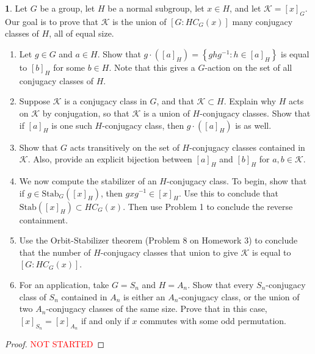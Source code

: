 \documentclass[12pt]{article}
\theoremstyle{definition}
\newtheorem{ex}{}
\begin{document}
\begin{ex}
	Let $G$ be a group, let $H$ be a normal subgroup, let $x \in H$, and let $\mathcal{K} = [x]_G$.
	Our goal is to prove that $\mathcal{K}$ is the union of $[G : HC_G(x)]$ many conjugacy classes of $H$, all of equal size.
	\begin{enumerate}[label=(\alph*)]
		\item Let $g \in G$ and $a \in H$.
		      Show that $g \cdot ([a]_H) = \left\lbrace ghg^{-1} : h \in [a]_H \right\rbrace$ is equal to $[b]_H$ for some $b \in H$.
		      Note that this gives a $G$-action on the set of all conjugacy classes of $H$.
		\item Suppose $\mathcal{K}$ is a conjugacy class in $G$, and that $\mathcal{K} \subset H$.
		      Explain why $H$ acts on $\mathcal{K}$ by conjugation, so that $\mathcal{K}$ is a union of $H$-conjugacy classes.
		      Show that if $[a]_H$ is one such $H$-conjugacy class, then $g \cdot ([a]_H)$ is as well.
		\item Show that $G$ acts transitively on the set of $H$-conjugacy classes contained in $\mathcal{K}$. Also, provide an explicit bijection between $[a]_H$ and $[b]_H$ for $a, b \in \mathcal{K}$.
		\item We now compute the stabilizer of an $H$-conjugacy class.
		      To begin, show that if $g \in \mathrm{Stab}_G([x]_H)$, then $gxg^{-1} \in [x]_H$.
		      Use this to conclude that $\mathrm{Stab}([x]_H) \subset HC_G(x)$.
		      Then use Problem 1 to conclude the reverse containment.
		\item Use the Orbit-Stabilizer theorem (Problem 8 on Homework 3) to conclude that the number of $H$-conjugacy classes that union to give $\mathcal{K}$ is equal to $[G : HC_G(x)]$.
		\item For an application, take $G = S_n$ and $H = A_n$.
		      Show that every $S_n$-conjugacy class of $S_n$ contained in $A_n$ is either an $A_n$-conjugacy class, or the union of two $A_n$-conjugacy classes of the same size.
		      Prove that in this case, $[x]_{S_n} = [x]_{A_n}$ if and only if $x$ commutes with some odd permutation.
	\end{enumerate}
\end{ex}
\begin{proof}
  \textcolor{red}{NOT STARTED}
\end{proof}
\end{document}
